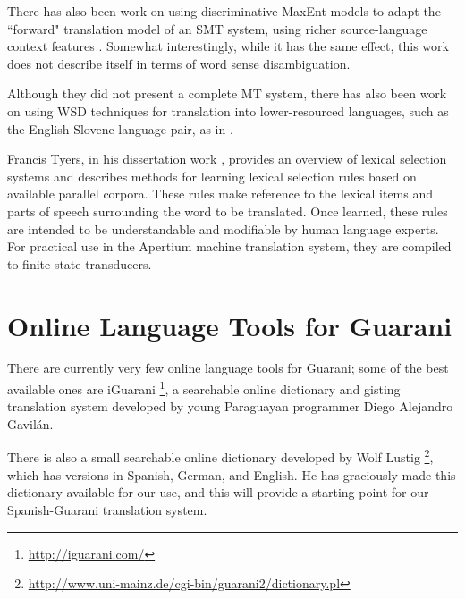 There has also been work on using discriminative MaxEnt models to adapt
the ``forward" translation model of an SMT system, using richer
source-language context features \cite{vzabokrtsky-popel-marevcek:2010:WMT}.
Somewhat interestingly, while it has the same effect, this work does not
describe itself in terms of word sense disambiguation.

Although they did not present a complete MT system, there has also been work
on using WSD techniques for translation into lower-resourced languages, such as
the English-Slovene language pair, as in
\cite{vintar-fivser-vrvsvcaj:2012:ESIRMT-HyTra2012}. 


Francis Tyers, in his dissertation work \cite{tyers-dissertation},
provides an overview of lexical selection systems and describes methods for
learning lexical selection rules based on available parallel corpora.
These rules make reference to the lexical items and parts of speech surrounding
the word to be translated. Once learned, these rules are intended to be
understandable and modifiable by human language experts. For practical use in
the Apertium machine translation system, they are compiled to finite-state
transducers.


\section{Online Language Tools for Guarani}
There are currently very few online language tools for Guarani; some of the
best available ones are iGuarani \footnote{\url{http://iguarani.com/}}, a
searchable online dictionary and gisting translation system developed by young
Paraguayan programmer Diego Alejandro Gavilán.

There is also a small searchable online dictionary developed by Wolf Lustig
\footnote{\url{http://www.uni-mainz.de/cgi-bin/guarani2/dictionary.pl}},
which has versions in Spanish, German, and English. He has graciously made this
dictionary available for our use, and this will provide a starting point for
our Spanish-Guarani translation system.


